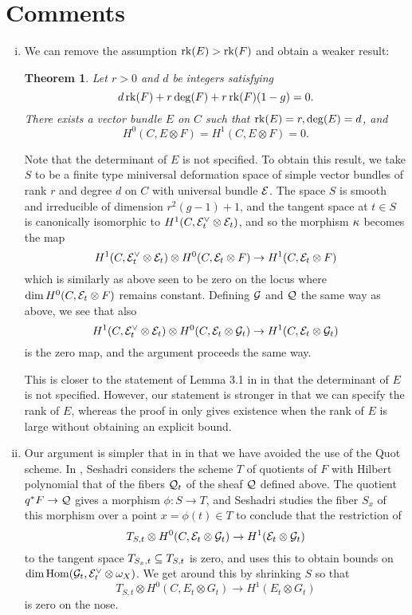 \documentclass[letterpaper,12pt]{amsart}
\newtheorem{thm}{Theorem}[section]
\theoremstyle{remark}
\begin{document}
\section{Comments}
\begin{enumerate}[(i)]
    \item We can remove the assumption $\operatorname{\mathrm{rk}}(E) > \operatorname{\mathrm{rk}}(F)$ and obtain a weaker result: 
    \begin{thm}
        Let $r > 0$ and $d$ be integers satisfying
        \[ d \operatorname{\mathrm{rk}}(F) + r \deg(F) + r \operatorname{\mathrm{rk}}(F) (1-g) = 0. \]
        There exists a vector bundle $E$ on $C$ such that $\operatorname{\mathrm{rk}}(E) = r, \deg(E) = d$, and 
        \[ H^0(C, E \otimes F) = H^1(C, E \otimes F) = 0. \]
    \end{thm}
    Note that the determinant of $E$ is not specified. To obtain this result, we take $S$ to be a finite type miniversal deformation space of simple vector bundles of rank $r$ and degree $d$ on $C$ with universal bundle $\mathcal{E}$. The space $S$ is smooth and irreducible of dimension $r^2(g-1)+1$, and the tangent space at $t \in S$ is canonically isomorphic to $H^1(C, \mathcal{E}_t^\vee \otimes \mathcal{E}_t)$, and so the morphism $\kappa$ becomes the map
    \[ H^1(C, \mathcal{E}_t^\vee \otimes \mathcal{E}_t) \otimes H^0(C, \mathcal{E}_t \otimes F) \to H^1(C, \mathcal{E}_t \otimes F) \]
    which is similarly as above seen to be zero on the locus where $\dim H^0(C, \mathcal{E}_t \otimes F)$ remains constant. Defining $\mathcal{G}$ and $\mathcal{Q}$ the same way as above, we see that also
    \[ H^1(C, \mathcal{E}_t^\vee \otimes \mathcal{E}_t) \otimes H^0(C, \mathcal{E}_t \otimes \mathcal{G}_t) \to H^1(C, \mathcal{E}_t \otimes \mathcal{G}_t) \]
    is the zero map, and the argument proceeds the same way. 
    
    This is closer to the statement of Lemma 3.1 in \cite{seshadri} in that the determinant of $E$ is not specified. However, our statement is stronger in that we can specify the rank of $E$, whereas the proof in \cite{seshadri} only gives existence when the rank of $E$ is large without obtaining an explicit bound.
 
    \item Our argument is simpler that in \cite{seshadri} in that we have avoided the use of the Quot scheme. In \cite{seshadri}, Seshadri considers the scheme $T$ of quotients of $F$ with Hilbert polynomial that of the fibers $\mathcal{Q}_t$ of the sheaf $\mathcal{Q}$ defined above. The quotient $q^*F \to \mathcal{Q}$ gives a morphism $\phi: S \to T$, and Seshadri studies the fiber $S_x$ of this morphism over a point $x = \phi(t) \in T$ to conclude that the restriction of
    \[ T_{S,t} \otimes H^0(C, \mathcal{E}_t \otimes \mathcal{G}_t) \to H^1(\mathcal{E}_t \otimes \mathcal{G}_t) \]
    to the tangent space $T_{S_x, t} \subseteq T_{S,t}$ is zero, and uses this to obtain bounds on $\dim \mathrm{Hom}(\mathcal{G}_t, \mathcal{E}_t^\vee \otimes \omega_X)$. We get around this by shrinking $S$ so that 
    \[ T_{S,t} \otimes H^0(C, E_t \otimes G_t) \to H^1(E_t \otimes G_t) \]
    is zero on the nose.
    

\end{enumerate}
\end{document}

